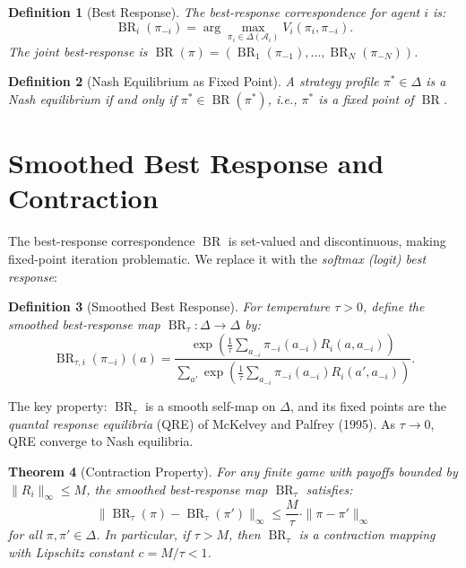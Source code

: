 \documentclass[11pt,a4paper]{article}
\newtheorem{theorem}{Theorem}[section]
\newtheorem{definition}[theorem]{Definition}
\DeclareMathOperator{\BR}{BR}
\begin{document}
\begin{definition}[Best Response]
The \emph{best-response correspondence} for agent $i$ is:
\begin{equation}
    \BR_i(\pi_{-i}) = \arg\max_{\pi_i \in \Delta(\mathcal{A}_i)} V_i(\pi_i, \pi_{-i}).
\end{equation}
The \emph{joint best-response} is $\BR(\pi) = (\BR_1(\pi_{-1}), \ldots, \BR_N(\pi_{-N}))$.
\end{definition}

\begin{definition}[Nash Equilibrium as Fixed Point]
A strategy profile $\pi^* \in \Delta$ is a Nash equilibrium if and only if
$\pi^* \in \BR(\pi^*)$, i.e., $\pi^*$ is a \emph{fixed point} of $\BR$.
\end{definition}


\section{Smoothed Best Response and Contraction}
\label{sec:contraction}

The best-response correspondence $\BR$ is set-valued and discontinuous,
making fixed-point iteration problematic. We replace it with the
\emph{softmax (logit) best response}:

\begin{definition}[Smoothed Best Response]
For temperature $\tau > 0$, define the smoothed best-response map
$\BR_\tau : \Delta \to \Delta$ by:
\begin{equation}\label{eq:soft-br}
    \BR_{\tau,i}(\pi_{-i})(a) = \frac{\exp\left(\frac{1}{\tau} \sum_{a_{-i}} \pi_{-i}(a_{-i}) R_i(a, a_{-i})\right)}
    {\sum_{a'} \exp\left(\frac{1}{\tau} \sum_{a_{-i}} \pi_{-i}(a_{-i}) R_i(a', a_{-i})\right)}.
\end{equation}
\end{definition}

The key property: $\BR_\tau$ is a smooth self-map on $\Delta$, and its
fixed points are the \emph{quantal response equilibria} (QRE) of
McKelvey and Palfrey (1995). As $\tau \to 0$, QRE converge to Nash equilibria.

\begin{theorem}[Contraction Property]\label{thm:contraction}
For any finite game with payoffs bounded by $\|R_i\|_\infty \leq M$,
the smoothed best-response map $\BR_\tau$ satisfies:
\begin{equation}
    \|\BR_\tau(\pi) - \BR_\tau(\pi')\|_\infty \leq \frac{M}{\tau} \cdot \|\pi - \pi'\|_\infty
\end{equation}
for all $\pi, \pi' \in \Delta$. In particular, if $\tau > M$, then
$\BR_\tau$ is a \emph{contraction mapping} with Lipschitz constant $c = M/\tau < 1$.
\end{theorem}
\end{document}

